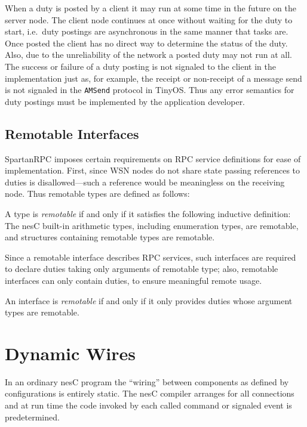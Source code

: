 When a duty is posted by a client it may run at some time in the future on the server node. The
client node continues at once without waiting for the duty to start, i.e.~duty postings are
asynchronous in the same manner that tasks are. Once posted the client has no direct way to
determine the status of the duty. Also, due to the unreliability of the network a posted duty
may not run at all. The success or failure of a duty posting is not signaled to the client in
the implementation just as, for example, the receipt or non-receipt of a message send is not
signaled in the \texttt{AMSend} protocol in TinyOS. Thus any error semantics for duty postings
must be implemented by the application developer.

\subsection{Remotable Interfaces}
\label{section-remotable}

SpartanRPC imposes certain requirements on RPC service definitions for ease of implementation.
First, since WSN nodes do not share state passing references to duties is disallowed---such a
reference would be meaningless on the receiving node. Thus remotable types are defined as
follows:
\begin{definition}A type is \emph{remotable} if and only if it satisfies the following inductive
  definition: The nesC built-in arithmetic types, including enumeration types, are remotable,
  and structures containing remotable types are remotable.
\end{definition}
Since a remotable interface describes RPC services, such interfaces are required to declare
duties taking only arguments of remotable type; also, remotable interfaces can only contain
duties, to ensure meaningful remote usage.
\begin{definition}
  An interface is \emph{remotable} if and only if it only provides duties whose argument types
  are remotable.
\end{definition}

\section{Dynamic Wires}
\label{section-dynamic-wires}

In an ordinary nesC program the ``wiring'' between components as defined by configurations is
entirely static. The nesC compiler arranges for all connections and at run time the code invoked
by each called command or signaled event is predetermined.

